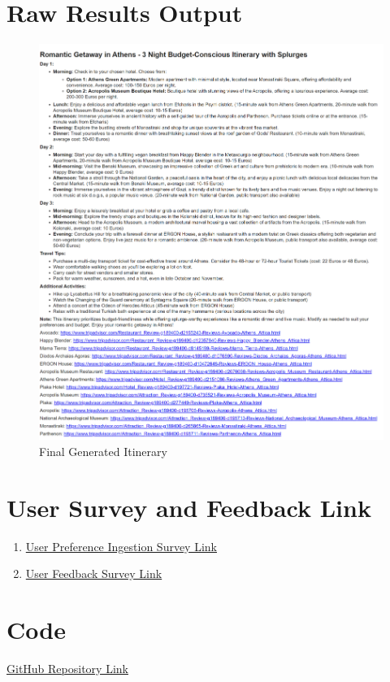 \documentclass[12pt,a4paper]{report}
\begin{document}
\chapter{Raw Results Output}

\begin{figure}[H]
    \centering
    \includegraphics[scale=.8]{finalitinerary}
    \caption{Final Generated Itinerary}
\end{figure}

\chapter{User Survey and Feedback Link}
\begin{enumerate}
\item{\href{https://forms.gle/BpDPoJoUeJ78FSmy7}{User Preference Ingestion Survey Link}}
\item{\href{https://forms.gle/YWLpgBsJyaWhmze57}{User Feedback Survey Link}}
\end{enumerate}



\chapter{Code}

\href{https://gitfront.io/r/am0445/2MEZzXsE1CYQ/GitHub}{GitHub Repository Link}
\end{document}
